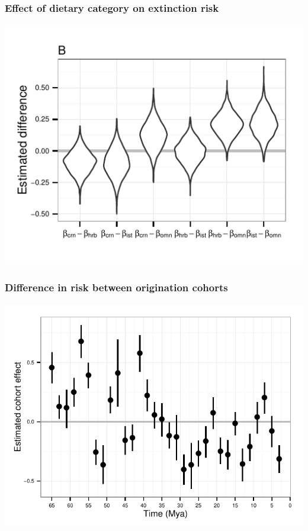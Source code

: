 \documentclass{beamer}
\begin{document}
\begin{frame}
  \frametitle{Effect of dietary category on extinction risk}

  \begin{center}
    \includegraphics[height=0.8\textheight,keepaspectratio=true]{figure/diet_diff_est}
  \end{center}

  \footnotesize{}
\end{frame}

\begin{frame}
  \frametitle{Difference in risk between origination cohorts}

  \begin{center}
    \includegraphics[height=0.8\textheight,keepaspectratio=true]{figure/cohort_est_pres}
  \end{center}

  \footnotesize{}
\end{frame}
\end{document}
